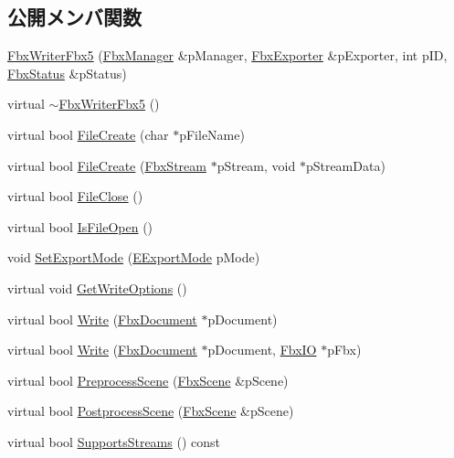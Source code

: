 \subsection*{公開メンバ関数}
\begin{DoxyCompactItemize}
\item 
\hyperlink{class_fbx_writer_fbx5_a5084efbd820cba3e7fe6e69aa30f2b87}{Fbx\+Writer\+Fbx5} (\hyperlink{class_fbx_manager}{Fbx\+Manager} \&p\+Manager, \hyperlink{class_fbx_exporter}{Fbx\+Exporter} \&p\+Exporter, int p\+ID, \hyperlink{class_fbx_status}{Fbx\+Status} \&p\+Status)
\item 
virtual \hyperlink{class_fbx_writer_fbx5_ac7ba6cb2dc06c7d54ad508d1738f21fd}{$\sim$\+Fbx\+Writer\+Fbx5} ()
\item 
virtual bool \hyperlink{class_fbx_writer_fbx5_a8abe68065893c971afb6b01bffc6bcaf}{File\+Create} (char $\ast$p\+File\+Name)
\item 
virtual bool \hyperlink{class_fbx_writer_fbx5_aafb683508c3203a2516d8ba74ed32501}{File\+Create} (\hyperlink{class_fbx_stream}{Fbx\+Stream} $\ast$p\+Stream, void $\ast$p\+Stream\+Data)
\item 
virtual bool \hyperlink{class_fbx_writer_fbx5_aa6731501c4006f1d4d18c32cea32e6c5}{File\+Close} ()
\item 
virtual bool \hyperlink{class_fbx_writer_fbx5_abe979bfdd626bd8b222a8385e6529a47}{Is\+File\+Open} ()
\item 
void \hyperlink{class_fbx_writer_fbx5_acc9f4ffbe4f27954c534a53b4a0ccb32}{Set\+Export\+Mode} (\hyperlink{class_fbx_writer_fbx5_a0424a2f24c66021ce1bfe4477eb4209e}{E\+Export\+Mode} p\+Mode)
\item 
virtual void \hyperlink{class_fbx_writer_fbx5_ad86d4ec0c944e5c552286fdcbd7ff86d}{Get\+Write\+Options} ()
\item 
virtual bool \hyperlink{class_fbx_writer_fbx5_a50a64e5e28a3ae1a89aa7107b80b7d26}{Write} (\hyperlink{class_fbx_document}{Fbx\+Document} $\ast$p\+Document)
\item 
virtual bool \hyperlink{class_fbx_writer_fbx5_ada64b2a137b4a93815496927725dc482}{Write} (\hyperlink{class_fbx_document}{Fbx\+Document} $\ast$p\+Document, \hyperlink{class_fbx_i_o}{Fbx\+IO} $\ast$p\+Fbx)
\item 
virtual bool \hyperlink{class_fbx_writer_fbx5_a05b65bf878f38bd34ab9d4bb2e292abf}{Preprocess\+Scene} (\hyperlink{class_fbx_scene}{Fbx\+Scene} \&p\+Scene)
\item 
virtual bool \hyperlink{class_fbx_writer_fbx5_a471fa8e52601150e6ec1926ef3e4f6b5}{Postprocess\+Scene} (\hyperlink{class_fbx_scene}{Fbx\+Scene} \&p\+Scene)
\item 
virtual bool \hyperlink{class_fbx_writer_fbx5_a6e6683ad630d545bd0251f7bf8e114d9}{Supports\+Streams} () const
\end{DoxyCompactItemize}
